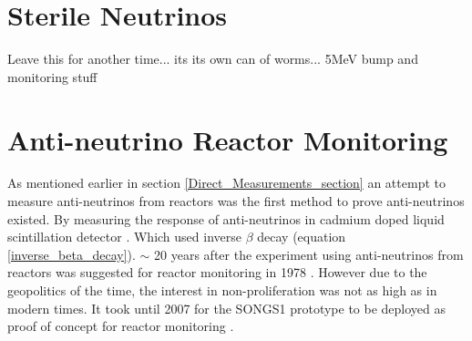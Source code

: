 \documentclass[12pt,a4paper]{article}
\begin{document}
\section{Sterile Neutrinos}
    Leave this for another time... its its own can of worms... 5MeV bump and monitoring stuff

\section{Anti-neutrino Reactor Monitoring}
As mentioned earlier in section \ref{Direct_Measurements_section} an attempt to measure anti-neutrinos from reactors was the first method to prove anti-neutrinos existed. By measuring the response of anti-neutrinos in cadmium doped liquid scintillation detector \cite{Cowan1956Confirmation}. Which used inverse $\beta$ decay (equation \ref{inverse_beta_decay}). $\sim$ 20 years after the experiment using anti-neutrinos from reactors was suggested for reactor monitoring in 1978 \cite{Borovoi_1978}. However due to the geopolitics of the time, the interest in non-proliferation was not as high as in modern times. It took until 2007 for the SONGS1 prototype to be deployed as proof of concept for reactor monitoring \cite{Bowden_2007}. 
\end{document}
